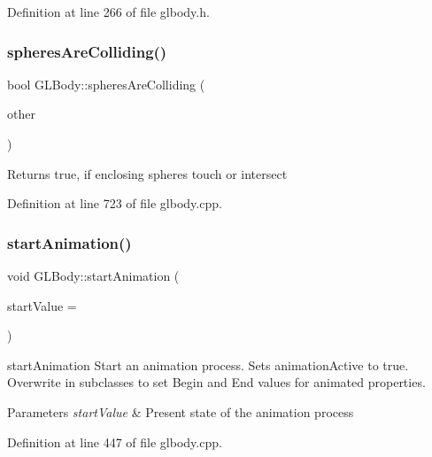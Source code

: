 Definition at line 266 of file glbody.\+h.

\mbox{\label{class_g_l_body_ab34746fd9ba6a8a0ba0a8e2b04e0fad3}} 
\subsubsection{\texorpdfstring{spheresAreColliding()}{spheresAreColliding()}}
{\footnotesize\ttfamily bool G\+L\+Body\+::spheres\+Are\+Colliding (\begin{DoxyParamCaption}\item[{const \mbox{\hyperlink{class_g_l_body}{G\+L\+Body}} $\ast$}]{other }\end{DoxyParamCaption})\hspace{0.3cm}{\ttfamily [virtual]}}

Returns true, if enclosing spheres touch or intersect 

Definition at line 723 of file glbody.\+cpp.

\mbox{\label{class_g_l_body_a5620eb1389c1aeb5694e4e7fc8a9e88c}} 
\subsubsection{\texorpdfstring{startAnimation()}{startAnimation()}}
{\footnotesize\ttfamily void G\+L\+Body\+::start\+Animation (\begin{DoxyParamCaption}\item[{float}]{start\+Value = {} }\end{DoxyParamCaption})\hspace{0.3cm}{\ttfamily [virtual]}}



start\+Animation Start an animation process. Sets animation\+Active to true. Overwrite in subclasses to set Begin and End values for animated properties. 


\begin{DoxyParams}{Parameters}
{\em start\+Value} & Present state of the animation process \\
\hline
\end{DoxyParams}


Definition at line 447 of file glbody.\+cpp.

